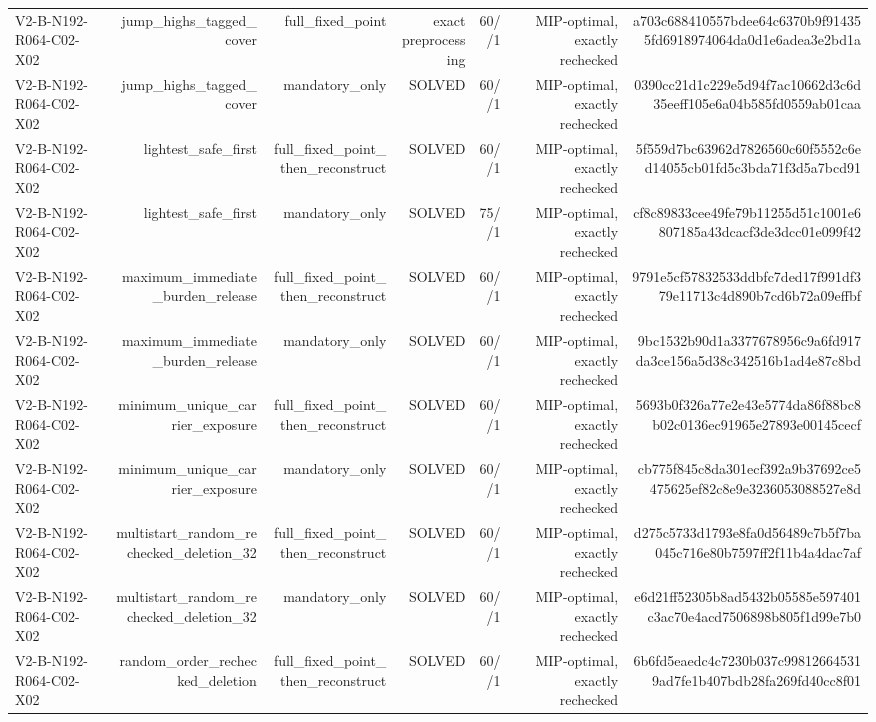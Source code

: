 {\begin{longtable}{lrrrrrr}
V2-B-N192-R064-C02-X02 & jump\_highs\_tagged\_cover & full\_fixed\_point & exact preprocessing & 60//1 & MIP-optimal, exactly rechecked & a703c688410557bdee64c6370b9f914355fd6918974064da0d1e6adea3e2bd1a \\
V2-B-N192-R064-C02-X02 & jump\_highs\_tagged\_cover & mandatory\_only & SOLVED & 60//1 & MIP-optimal, exactly rechecked & 0390cc21d1c229e5d94f7ac10662d3c6d35eeff105e6a04b585fd0559ab01caa \\
V2-B-N192-R064-C02-X02 & lightest\_safe\_first & full\_fixed\_point\_then\_reconstruct & SOLVED & 60//1 & MIP-optimal, exactly rechecked & 5f559d7bc63962d7826560c60f5552c6ed14055cb01fd5c3bda71f3d5a7bcd91 \\
V2-B-N192-R064-C02-X02 & lightest\_safe\_first & mandatory\_only & SOLVED & 75//1 & MIP-optimal, exactly rechecked & cf8c89833cee49fe79b11255d51c1001e6807185a43dcacf3de3dcc01e099f42 \\
V2-B-N192-R064-C02-X02 & maximum\_immediate\_burden\_release & full\_fixed\_point\_then\_reconstruct & SOLVED & 60//1 & MIP-optimal, exactly rechecked & 9791e5cf57832533ddbfc7ded17f991df379e11713c4d890b7cd6b72a09effbf \\
V2-B-N192-R064-C02-X02 & maximum\_immediate\_burden\_release & mandatory\_only & SOLVED & 60//1 & MIP-optimal, exactly rechecked & 9bc1532b90d1a3377678956c9a6fd917da3ce156a5d38c342516b1ad4e87c8bd \\
V2-B-N192-R064-C02-X02 & minimum\_unique\_carrier\_exposure & full\_fixed\_point\_then\_reconstruct & SOLVED & 60//1 & MIP-optimal, exactly rechecked & 5693b0f326a77e2e43e5774da86f88bc8b02c0136ec91965e27893e00145cecf \\
V2-B-N192-R064-C02-X02 & minimum\_unique\_carrier\_exposure & mandatory\_only & SOLVED & 60//1 & MIP-optimal, exactly rechecked & cb775f845c8da301ecf392a9b37692ce5475625ef82c8e9e3236053088527e8d \\
V2-B-N192-R064-C02-X02 & multistart\_random\_rechecked\_deletion\_32 & full\_fixed\_point\_then\_reconstruct & SOLVED & 60//1 & MIP-optimal, exactly rechecked & d275c5733d1793e8fa0d56489c7b5f7ba045c716e80b7597ff2f11b4a4dac7af \\
V2-B-N192-R064-C02-X02 & multistart\_random\_rechecked\_deletion\_32 & mandatory\_only & SOLVED & 60//1 & MIP-optimal, exactly rechecked & e6d21ff52305b8ad5432b05585e597401c3ac70e4acd7506898b805f1d99e7b0 \\
V2-B-N192-R064-C02-X02 & random\_order\_rechecked\_deletion & full\_fixed\_point\_then\_reconstruct & SOLVED & 60//1 & MIP-optimal, exactly rechecked & 6b6fd5eaedc4c7230b037c998126645319ad7fe1b407bdb28fa269fd40cc8f01 \\

\end{longtable}}
